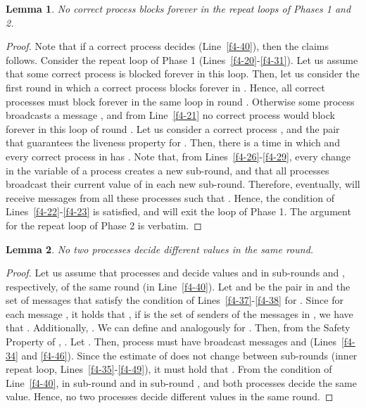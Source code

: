 \documentclass[10pt, conference, compsocconf]{IEEEtran}
\newtheorem{lemma}{Lemma}
\begin{document}
\begin{lemma}
\label{no-block-repeats}
No correct process blocks forever in the repeat loops of Phases 1 and 2.
\end{lemma}
\begin{proof}
Note that if a correct  process decides (Line~\ref{f4-40}), then the claims
follows.  
Consider the repeat loop of Phase 1 (Lines~\ref{f4-20}-\ref{f4-31}). Let us
assume that some correct process is blocked forever in  
this loop.  Then, let us  consider the first  round  in which  a correct
process  blocks forever  in .  Hence, all  correct processes  must block
forever in the same loop in  round . Otherwise some process broadcasts a
message  
, and from Line~\ref{f4-21} no correct process would block
forever in this loop of round . 
Let us consider a correct process , and the pair  that guarantees
the liveness property for . Then, there 
is a time in which  and every correct process  in
 has . 
Note that, from Lines~\ref{f4-26}-\ref{f4-29}, every change in the variable
 of  a process creates a  new sub-round, and  that all processes
broadcast   their    current   value   of       in   each   new
sub-round. Therefore,  
eventually,   will receive  messages  from  all these
processes   such    that   .   Hence,    the   condition   of
Lines~\ref{f4-22}-\ref{f4-23} is  satisfied, and  will exit  the loop of
Phase 1. The argument for the repeat loop of  
Phase 2 is verbatim.
\end{proof}

\begin{lemma}
\label{no-different-dec}
No two processes decide different values in the same round.
\end{lemma}
\begin{proof}
Let us assume that processes   and  decide values  and 
in sub-rounds   and  , respectively, of  the same round   (in
Line~\ref{f4-40}).   Let     and     be   the  pair   in
 and  the set  of messages that  satisfy the  condition of
Lines~\ref{f4-37}-\ref{f4-38} for . Since for each message 
,  it holds that , if  is
the set  of senders of the messages  in , we have  that . Additionally, . 
We can define  and   analogously for . Then, from the
Safety Property of , . Let .   Then,   process      must   have   broadcast   messages
        and        
(Lines~\ref{f4-34}  and \ref{f4-46}).  Since the  estimate   of
   does   not   change   between   sub-rounds   (inner   repeat   loop,
Lines~\ref{f4-35}-\ref{f4-49}),  it  must  hold  that .  From  the
condition of  Line~\ref{f4-40},  in  sub-round  and
 in sub-round ,  and both processes decide the same
value. Hence, no two processes decide different values in the same round. 
\end{proof}
\end{document}
